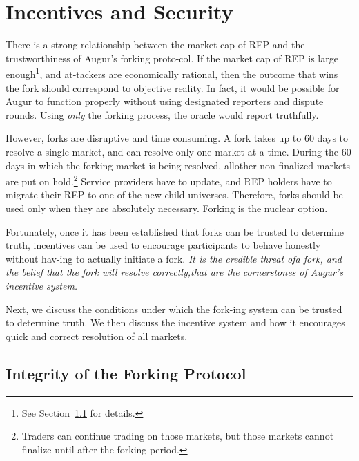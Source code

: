 \documentclass[12pt,floatfix,reprint,nofootinbib,amsmath,amssymb,epsfig,pre,floats,letterpaper,groupedaffiliation]{revtex4-1}
\theoremstyle{definition}
\theoremstyle{definition}
\begin{document}
\section{Incentives and Security}\label{section:incentives_and_security}

There is a strong relationship between the market cap of REP and the trustworthiness of Augur's forking proto-\linebreak col. If the market cap of REP is large enough\footnote{See Section~\ref{section:integrity_forking_protocol} for details.}, and at-\linebreak tackers are economically rational, then the outcome that wins the fork should correspond to objective reality. In fact, it would be possible for Augur to function properly without using designated reporters and dispute rounds. Using \textit{only} the forking process, the oracle would report truthfully.

However, forks are disruptive and time consuming. A fork takes up to 60 days to resolve a single market, and can resolve only one market at a time. During the 60 days in which the forking market is being resolved, all\linebreak other non-finalized markets are put on hold.\footnote{Traders can continue trading on those markets, but those markets cannot finalize until after the forking period.} Service providers have to update, and REP holders have to migrate their REP to one of the new child universes. Therefore, forks should be used only when they are absolutely necessary. Forking is the nuclear option.

Fortunately, once it has been established that forks can be trusted to determine truth, incentives can be used to encourage participants to behave honestly without hav-\linebreak ing to actually initiate a fork. \textit{It is the credible threat of\linebreak a fork, and the belief that the fork will resolve correctly,\linebreak that are the cornerstones of Augur's incentive system.}

Next, we discuss the conditions under which the fork-\linebreak ing system can be trusted to determine truth. We then discuss the incentive system and how it encourages quick and correct resolution of all markets.

\subsection{Integrity of the Forking Protocol}\label{section:integrity_forking_protocol}
\end{document}
